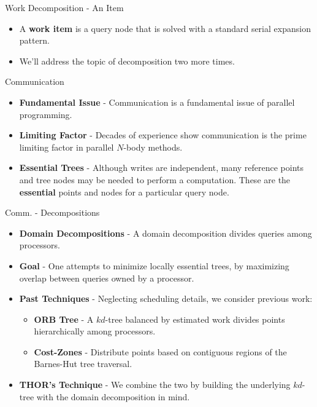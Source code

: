 \documentclass[pdf,colorBG,slideColor]{prosper}
\newcommand{\itemt}[1]{\item {\bf #1} -}
\newcommand{\defterm}[1]{{\bf #1}}
\begin{document}
\begin{slide}{Work Decomposition - An Item}
  \begin{itemize}
    \item A \defterm{work item} is a query node that is solved with a standard
    serial expansion pattern.
    \item We'll address the topic of decomposition two more times.
  \end{itemize}
\end{slide}

\begin{slide}{Communication}
  \begin{itemize}
    \itemt{Fundamental Issue} Communication is a fundamental issue of parallel programming.
    \itemt{Limiting Factor} Decades of experience show communication is the prime
    limiting factor in parallel $N$-body methods.
    \itemt{Essential Trees} Although writes are independent, many reference
    points and tree nodes may be needed to perform a computation.  These are
    the \defterm{essential} points and nodes for a particular query node.
  \end{itemize}
\end{slide}

\begin{slide}{Comm. - Decompositions}
  \begin{itemize}
    \itemt{Domain Decompositions}
    A domain decomposition divides queries among processors.
    \itemt{Goal}
    One attempts to minimize locally essential trees, by maximizing
    overlap between queries owned by a processor.
    \itemt{Past Techniques}
    Neglecting scheduling details, we consider previous work:
    \begin{itemize}
      \itemt{ORB Tree} A $kd$-tree balanced by estimated work divides
      points hierarchically among processors.
      \itemt{Cost-Zones} Distribute points based on contiguous regions of
      the Barnes-Hut tree traversal.
    \end{itemize}
    \itemt{THOR's Technique}
    We combine the two by building the underlying $kd$-tree with
    the domain decomposition in mind.
  \end{itemize}
\end{slide}
\end{document}
